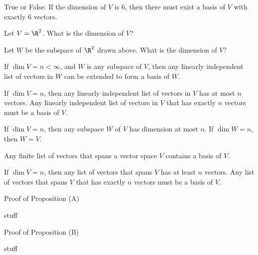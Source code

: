 True or False: If the dimension of $V$ is 6, then there must exist a basis of $V$ with exactly 6 vectors.


\edXsolution{
}

\endedxproblem


Let $V = \R^2$.  What is the dimension of $V$?  


\edXsolution{
}

\endedxproblem




\begin{center}

\end{center}

Let $W$ be the subspace of $\R^2$ drawn above.  What is the dimension of $V$?  



\edXsolution{
}

\endedxproblem


\endedxvertical










{}  If $\dim V = n < \infty$, and $W$ is any subspace of $V$, then any
linearly independent list of vectors in $W$ can be extended to form a basis of $W$.  

{} If $\dim V = n$, then any linearly independent list of vectors in $V$ has
at most $n$ vectors.  Any linearly independent list of vectors in $V$ that has exactly $n$ vectors must
be a basis of $V$.  


{} If $\dim V = n$, then any subspace $W$ of $V$ has dimension at most $n$.  
If $\dim W = n$, then $W = V$.  


{} Any finite list of vectors that spans a vector space $V$ contains a basis of $V$.  

{} If $\dim V = n$, then any list of vectors that spans $V$ has
at least $n$ vectors.  Any  list of vectors that spans $V$ that has exactly $n$ vectors must
be a basis of $V$.  


\begin{edXshowhide}{Proof of Proposition (A)}

stuff

\end{edXshowhide}


\begin{edXshowhide}{Proof of Proposition (B)}

stuff

\end{edXshowhide}



\endedxtext

\endedxvertical
